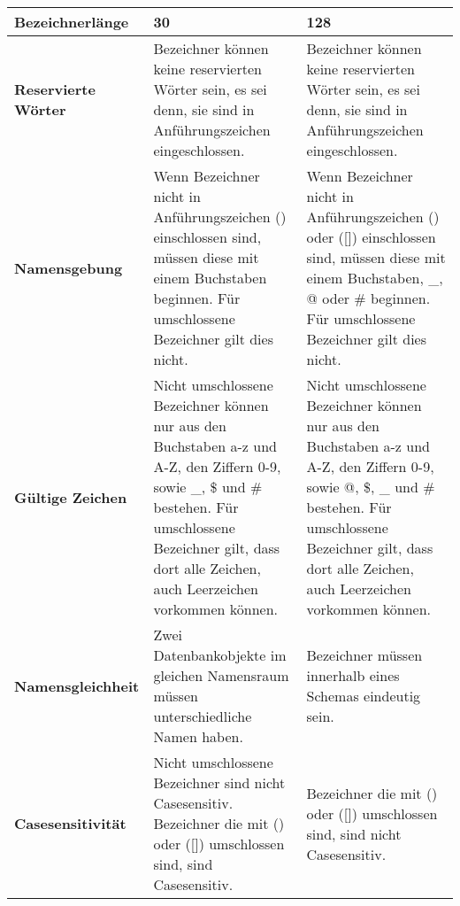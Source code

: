         \begin{center}
          \label{createtablerestrictions}
          \begin{small}
            \tabletail{
              \hline
            }
            \tablelasttail{
              \hline
            }
            \begin{supertabular}{|l|p{5.5cm}|p{5.5cm}|}
              \textbf{Bezeichnerl\"ange} & 30 & 128\\
              \hline
              \textbf{Reservierte W\"orter} & Bezeichner k\"onnen keine reservierten W\"orter sein, es sei denn, sie sind in Anf\"uhrungszeichen  eingeschlossen. & Bezeichner k\"onnen keine reservierten W\"orter sein, es sei denn, sie sind in Anf\"uhrungszeichen  eingeschlossen. \\
              \hline
              \textbf{Namensgebung} & Wenn Bezeichner nicht in Anf\"uhrungszeichen () einschlossen sind, m\"ussen diese mit einem Buchstaben beginnen. F\"ur umschlossene Bezeichner gilt dies nicht. & Wenn Bezeichner nicht in Anf\"uhrungszeichen () oder ([]) einschlossen sind, m\"ussen diese mit einem Buchstaben, \_, @ oder \# beginnen. F\"ur umschlossene Bezeichner gilt dies nicht. \\
              \hline
              \textbf{G\"ultige Zeichen} & Nicht umschlossene Bezeichner k\"onnen nur aus den Buchstaben a-z und A-Z, den Ziffern 0-9, sowie \_, \$ und \# bestehen. F\"ur umschlossene Bezeichner gilt, dass dort alle Zeichen, auch Leerzeichen vorkommen k\"onnen. & Nicht umschlossene Bezeichner k\"onnen nur aus den Buchstaben a-z und A-Z, den Ziffern 0-9, sowie @, \$, \_ und \# bestehen. F\"ur umschlossene Bezeichner gilt, dass dort alle Zeichen, auch Leerzeichen vorkommen k\"onnen. \\
              \hline
              \textbf{Namensgleichheit} & Zwei Datenbankobjekte im gleichen Namensraum m\"ussen unterschiedliche Namen haben.  & Bezeichner m\"ussen innerhalb eines Schemas eindeutig sein.\\
              \hline
              \textbf{Casesensitivit\"at} & Nicht umschlossene Bezeichner sind nicht Casesensitiv. Bezeichner die mit () oder ([]) umschlossen sind, sind Casesensitiv. & Bezeichner die mit () oder ([]) umschlossen sind, sind nicht Casesensitiv. \\
            \end{supertabular}
          \end{small}
        \end{center}
